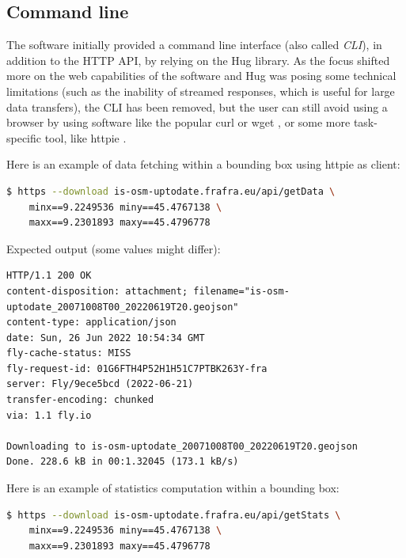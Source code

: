 \documentclass{Configuration_Files/PoliMi3i_thesis}
\begin{document}
\subsection{Command line}

The software initially provided a command line interface (also called \textit{CLI}), in addition to the HTTP API, by relying on the Hug library. As the focus shifted more on the web capabilities of the software and Hug was posing some technical limitations (such as the inability of streamed responses, which is useful for large data transfers), the CLI has been removed, but the user can still avoid using a browser by using software like the popular curl \cite{CurlCurl2022} or wget \cite{WgetGNUProject}, or some more task-specific tool, like httpie \cite{HTTPieHumanfriendlyCLI2022}.

\noindent Here is an example of data fetching within a bounding box using httpie as client:

\begin{minipage}{\linewidth}
\begin{lstlisting}[language=bash]
$ https --download is-osm-uptodate.frafra.eu/api/getData \
    minx==9.2249536 miny==45.4767138 \
    maxx==9.2301893 maxy==45.4796778
\end{lstlisting}
\end{minipage}

\noindent Expected output (some values might differ):

\begin{lstlisting}
HTTP/1.1 200 OK
content-disposition: attachment; filename="is-osm-uptodate_20071008T00_20220619T20.geojson"
content-type: application/json
date: Sun, 26 Jun 2022 10:54:34 GMT
fly-cache-status: MISS
fly-request-id: 01G6FTH4P52H1H51C7PTBK263Y-fra
server: Fly/9ece5bcd (2022-06-21)
transfer-encoding: chunked
via: 1.1 fly.io

Downloading to is-osm-uptodate_20071008T00_20220619T20.geojson
Done. 228.6 kB in 00:1.32045 (173.1 kB/s)
\end{lstlisting}

\noindent Here is an example of statistics computation within a bounding box:

\begin{minipage}{\linewidth}
\begin{lstlisting}[language=bash]
$ https --download is-osm-uptodate.frafra.eu/api/getStats \
    minx==9.2249536 miny==45.4767138 \
    maxx==9.2301893 maxy==45.4796778
\end{lstlisting}
\end{minipage}
\end{document}
